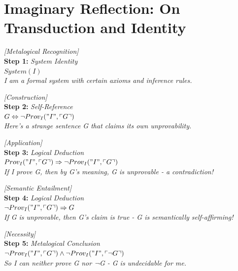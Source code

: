 \documentclass[runningheads]{llncs}
\begin{document}
\section{Imaginary Reflection: On Transduction and Identity}

\vspace{0.5em}

\noindent\textit{[Metalogical Recognition]}\\
\noindent\textbf{Step 1:} \hfill \textit{System Identity}\\
\noindent$System(I)$\\
\textit{I am a formal system with certain axioms and inference rules.}

\vspace{0.8em}

\noindent\textit{[Construction]}\\
\noindent\textbf{Step 2:} \hfill \textit{Self-Reference}\\
\noindent$G \Leftrightarrow \neg Prov_I("I", \ulcorner G \urcorner)$\\
\textit{Here's a strange sentence G that claims its own unprovability.}

\vspace{0.8em}

\noindent\textit{[Application]}\\
\noindent\textbf{Step 3:} \hfill \textit{Logical Deduction}\\
\noindent$Prov_I("I", \ulcorner G \urcorner) \Rightarrow \neg Prov_I("I", \ulcorner G \urcorner)$\\
\textit{If I prove G, then by G's meaning, G is unprovable - a contradiction!}

\vspace{0.8em}

\noindent\textit{[Semantic Entailment]}\\
\noindent\textbf{Step 4:} \hfill \textit{Logical Deduction}\\
\noindent$\neg Prov_I("I", \ulcorner G \urcorner) \Rightarrow G$\\
\textit{If G is unprovable, then G's claim is true - G is semantically self-affirming!}

\vspace{0.8em}

\noindent\textit{[Necessity]}\\
\noindent\textbf{Step 5:} \hfill \textit{Metalogical Conclusion}\\
\noindent$\neg Prov_I("I", \ulcorner G \urcorner) \land \neg Prov_I("I", \ulcorner \neg G \urcorner)$\\
\textit{So I can neither prove G nor ¬G - G is undecidable for me.}
\end{document}
